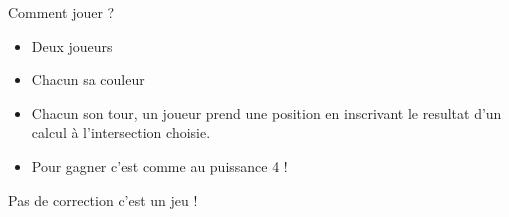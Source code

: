 \numeroteEnigme
\begin{enigme}[Puissance 4 !]
    Comment jouer ?
    \begin{itemize}
        \item Deux joueurs
        \item Chacun sa couleur
        \item Chacun son tour, un joueur prend une position en inscrivant le resultat d'un calcul à l'intersection choisie.
        \item Pour gagner c'est comme au puissance 4 !
    \end{itemize}
\end{enigme}

\addtocounter{exercice}{-1}
\begin{corrige}
    Pas de correction c'est un jeu !    
\end{corrige}